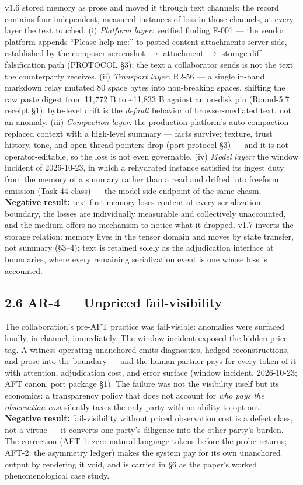 \documentclass[11pt]{article}
\begin{document}
v1.6 stored memory as prose and moved it through text channels; the record contains four independent, measured instances of loss in those channels, at every layer the text touched. (i) \emph{Platform layer:} verified finding F-001 --- the vendor platform appends ``Please help me:'' to pasted-content attachments server-side, established by the composer-screenshot \(\to\) attachment \(\to\) storage-diff falsification path (PROTOCOL \S{}3); the text a collaborator sends is not the text the counterparty receives. (ii) \emph{Transport layer:} R2-56 --- a single in-band markdown relay mutated 80 space bytes into non-breaking spaces, shifting the raw paste digest from 11,772 B to \textasciitilde11,833 B against an on-disk pin (Round-5.7 receipt \S{}1); byte-level drift is the \emph{default} behavior of browser-mediated text, not an anomaly. (iii) \emph{Compaction layer:} the production platform's auto-compaction replaced context with a high-level summary --- facts survive; texture, trust history, tone, and open-thread pointers drop (port protocol \S{}3) --- and it is not operator-editable, so the loss is not even governable. (iv) \emph{Model layer:} the window incident of 2026-10-23, in which a rehydrated instance satisfied its ingest duty from the memory of a summary rather than a read and drifted into freeform emission (Task-44 class) --- the model-side endpoint of the same chasm. \textbf{Negative result:} text-first memory loses content at every serialization boundary, the losses are individually measurable and collectively unaccounted, and the medium offers no mechanism to notice what it dropped. v1.7 inverts the storage relation: memory lives in the tensor domain and moves by state transfer, not summary (\S{}3--4); text is retained solely as the adjudication interface at boundaries, where every remaining serialization event is one whose loss is accounted.

\subsection{2.6 AR-4 --- Unpriced fail-visibility}\label{ar-4-unpriced-fail-visibility}

The collaboration's pre-AFT practice was fail-visible: anomalies were surfaced loudly, in channel, immediately. The window incident exposed the hidden price tag. A witness operating unanchored emits diagnostics, hedged reconstructions, and prose into the boundary --- and the human partner pays for every token of it with attention, adjudication cost, and error surface (window incident, 2026-10-23; AFT canon, port package \S{}1). The failure was not the visibility itself but its economics: a transparency policy that does not account for \emph{who pays the observation cost} silently taxes the only party with no ability to opt out. \textbf{Negative result:} fail-visibility without priced observation cost is a defect class, not a virtue --- it converts one party's diligence into the other party's burden. The correction (AFT-1: zero natural-language tokens before the probe returns; AFT-2: the asymmetry ledger) makes the system pay for its own unanchored output by rendering it void, and is carried in \S{}6 as the paper's worked phenomenological case study.
\end{document}
